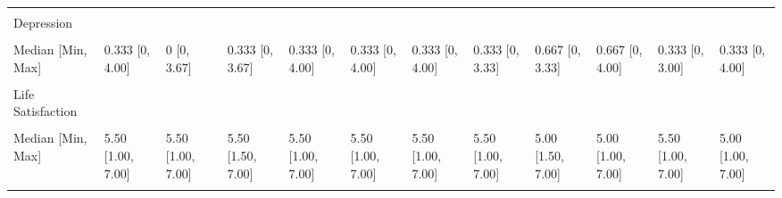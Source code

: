 \documentclass[
  single column]{article}
\begin{document}
\begin{landscape}
\begin{longtable}[t]{llllllllllll}
\cellcolor{gray!10}{Missing} & \cellcolor{gray!10}{39 (0.2\%)} & \cellcolor{gray!10}{2 (0.1\%)} & \cellcolor{gray!10}{0 (0\%)} & \cellcolor{gray!10}{5 (0.2\%)} & \cellcolor{gray!10}{11 (0.3\%)} & \cellcolor{gray!10}{0 (0\%)} & \cellcolor{gray!10}{0 (0\%)} & \cellcolor{gray!10}{0 (0\%)} & \cellcolor{gray!10}{4 (0.6\%)} & \cellcolor{gray!10}{1 (0.2\%)} & \cellcolor{gray!10}{6 (0.8\%)}\\
Depression &  &  &  &  &  &  &  &  &  &  & \\
\cellcolor{gray!10}{Mean (SD)} & \cellcolor{gray!10}{0.629 (0.797)} & \cellcolor{gray!10}{0.456 (0.665)} & \cellcolor{gray!10}{0.594 (0.783)} & \cellcolor{gray!10}{0.540 (0.719)} & \cellcolor{gray!10}{0.554 (0.743)} & \cellcolor{gray!10}{0.596 (0.766)} & \cellcolor{gray!10}{0.746 (0.900)} & \cellcolor{gray!10}{0.839 (0.912)} & \cellcolor{gray!10}{0.980 (0.908)} & \cellcolor{gray!10}{0.486 (0.684)} & \cellcolor{gray!10}{0.819 (0.945)}\\
Median [Min, Max] & 0.333 [0, 4.00] & 0 [0, 3.67] & 0.333 [0, 3.67] & 0.333 [0, 4.00] & 0.333 [0, 4.00] & 0.333 [0, 4.00] & 0.333 [0, 3.33] & 0.667 [0, 3.33] & 0.667 [0, 4.00] & 0.333 [0, 3.00] & 0.333 [0, 4.00]\\
\addlinespace
\cellcolor{gray!10}{Missing} & \cellcolor{gray!10}{37 (0.2\%)} & \cellcolor{gray!10}{2 (0.1\%)} & \cellcolor{gray!10}{0 (0\%)} & \cellcolor{gray!10}{5 (0.2\%)} & \cellcolor{gray!10}{10 (0.3\%)} & \cellcolor{gray!10}{0 (0\%)} & \cellcolor{gray!10}{0 (0\%)} & \cellcolor{gray!10}{0 (0\%)} & \cellcolor{gray!10}{4 (0.6\%)} & \cellcolor{gray!10}{1 (0.2\%)} & \cellcolor{gray!10}{6 (0.8\%)}\\
Life Satisfaction &  &  &  &  &  &  &  &  &  &  & \\
\cellcolor{gray!10}{Mean (SD)} & \cellcolor{gray!10}{5.07 (1.30)} & \cellcolor{gray!10}{5.37 (1.19)} & \cellcolor{gray!10}{5.18 (1.33)} & \cellcolor{gray!10}{5.23 (1.26)} & \cellcolor{gray!10}{5.23 (1.23)} & \cellcolor{gray!10}{5.18 (1.29)} & \cellcolor{gray!10}{5.19 (1.31)} & \cellcolor{gray!10}{4.81 (1.40)} & \cellcolor{gray!10}{4.99 (1.27)} & \cellcolor{gray!10}{5.34 (1.19)} & \cellcolor{gray!10}{4.90 (1.49)}\\
Median [Min, Max] & 5.50 [1.00, 7.00] & 5.50 [1.00, 7.00] & 5.50 [1.50, 7.00] & 5.50 [1.00, 7.00] & 5.50 [1.00, 7.00] & 5.50 [1.00, 7.00] & 5.50 [1.00, 7.00] & 5.00 [1.50, 7.00] & 5.00 [1.00, 7.00] & 5.50 [1.00, 7.00] & 5.00 [1.00, 7.00]\\
\cellcolor{gray!10}{Missing} & \cellcolor{gray!10}{337 (1.6\%)} & \cellcolor{gray!10}{21 (1.5\%)} & \cellcolor{gray!10}{4 (1.5\%)} & \cellcolor{gray!10}{42 (2.1\%)} & \cellcolor{gray!10}{85 (2.3\%)} & \cellcolor{gray!10}{24 (2.2\%)} & \cellcolor{gray!10}{4 (2.9\%)} & \cellcolor{gray!10}{6 (6.9\%)} & \cellcolor{gray!10}{2 (0.3\%)} & \cellcolor{gray!10}{13 (2.3\%)} & \cellcolor{gray!10}{16 (2.2\%)}\\

\end{longtable}
\end{landscape}
\end{document}
